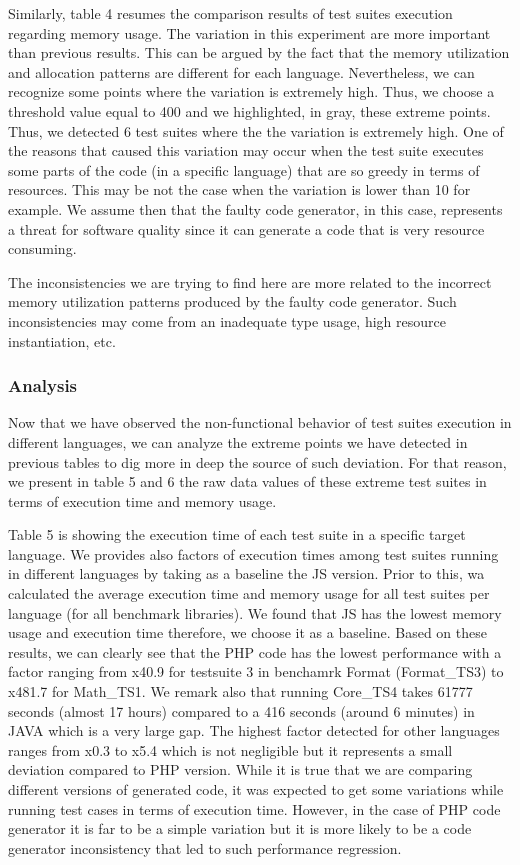 Similarly, table 4 resumes the comparison results of test suites execution regarding memory usage. The variation in this experiment are more important than previous results. This can be argued by the fact that the memory utilization and allocation patterns are different for each language. Nevertheless, we can recognize some points where the variation is extremely high. Thus, we choose a threshold value equal to 400 and we highlighted, in gray, these extreme points. Thus, we detected 6 test suites where the the variation is extremely high. 
One of the reasons that caused this variation may occur when the test suite executes some parts of the code (in a specific language) that are so greedy in terms of resources. This may be not the case when the variation is lower than 10 for example.
We assume then that the faulty code generator, in this case, represents a threat for software quality since it can generate a code that is very resource consuming.
 
The inconsistencies we are trying to find here are more related to the incorrect memory utilization patterns produced by the faulty code generator. Such inconsistencies may come from an inadequate type usage, high resource instantiation, etc.





\subsubsection{Analysis}
Now that we have observed the non-functional behavior of test suites execution in different languages, we can analyze the extreme points we have detected in previous tables to dig more in deep the source of such deviation.
For that reason, we present in table 5 and 6 the raw data values of these extreme test suites in terms of execution time and memory usage. 

Table 5 is showing the execution time of each test suite in a specific target language. We provides also factors of execution times among test suites running in different languages by taking as a baseline the JS version. 
Prior to this, wa calculated the average execution time and memory usage for all test suites per language (for all benchmark libraries). We found that JS has the lowest memory usage and execution time therefore, we choose it as a baseline. Based on these results, we can clearly see that the PHP code has the lowest performance with a factor ranging from x40.9 for testsuite 3 in benchamrk Format (Format\_TS3) to x481.7 for Math\_TS1. We remark also that running Core\_TS4 takes 61777 seconds (almost 17 hours) compared to a 416 seconds (around 6 minutes) in JAVA which is a very large gap. The highest factor detected for other languages ranges from x0.3 to x5.4 which is not negligible but it represents a small deviation compared to PHP version. While it is true that we are comparing different versions of generated code, it was expected to get some variations while running test cases in terms of execution time. However, in the case of PHP code generator it is far to be a simple variation but it is more likely to be a code generator inconsistency that led to such performance regression. 

